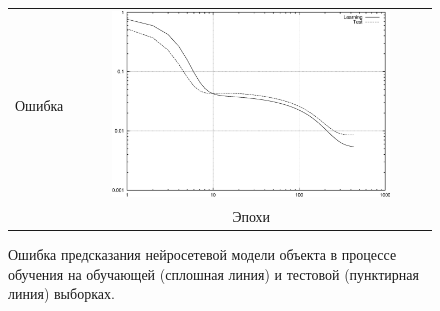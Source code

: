 \begin{figure}
\centering
  \begin{tabular}{rc}
    \begin{sideways}
      {\hspace{4cm}\small Ошибка}
    \end{sideways}
    &
    \includegraphics[width=0.8\textwidth,%
                     totalheight=0.35\textheight]{moby_nnp_training}\\
    & {\small Эпохи} \\
\end{tabular}
\caption{Ошибка предсказания нейросетевой модели объекта в процессе обучения
на обучающей (сплошная линия) и тестовой (пунктирная линия) выборках.}
\label{fig:moby_nnp_training}
\end{figure}

